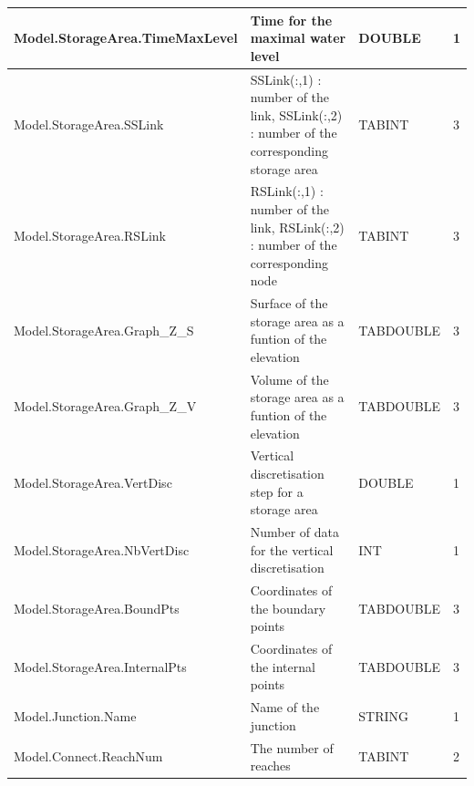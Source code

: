 \documentclass[a4paper,11pt]{article}
\begin{document}
\begin{landscape}
\begin{table}[ht]
\begin{center}
\begin{tabular}{|l|l|l|l|}
\hline  Model.StorageArea.TimeMaxLevel & Time for the maximal water level & DOUBLE & 1 \\
\hline  Model.StorageArea.SSLink & SSLink(:,1) : number of the link, SSLink(:,2) : number of the corresponding storage area & TABINT & 3 \\
\hline  Model.StorageArea.RSLink & RSLink(:,1) : number of the link, RSLink(:,2) : number of the corresponding node & TABINT & 3 \\
\hline  Model.StorageArea.Graph\_Z\_S & Surface of the storage area as a funtion of the elevation & TABDOUBLE & 3 \\
\hline  Model.StorageArea.Graph\_Z\_V & Volume of the storage area as a funtion of the elevation & TABDOUBLE & 3 \\
\hline  Model.StorageArea.VertDisc & Vertical discretisation step for a storage area & DOUBLE & 1 \\
\hline  Model.StorageArea.NbVertDisc & Number of data for the vertical discretisation & INT & 1 \\
\hline  Model.StorageArea.BoundPts & Coordinates of the boundary points & TABDOUBLE & 3 \\
\hline  Model.StorageArea.InternalPts & Coordinates of the internal points & TABDOUBLE & 3 \\
\hline  Model.Junction.Name & Name of the junction & STRING & 1 \\
\hline  Model.Connect.ReachNum & The number of reaches & TABINT & 2 \\
\hline

\end{tabular} 
\end{center}
\end{table}
\begin{table}[ht]
\begin{center}
\begin{tabular}{|l|l|l|l|}


\end{tabular}
\end{center}
\end{table}
\end{landscape}
\end{document}
